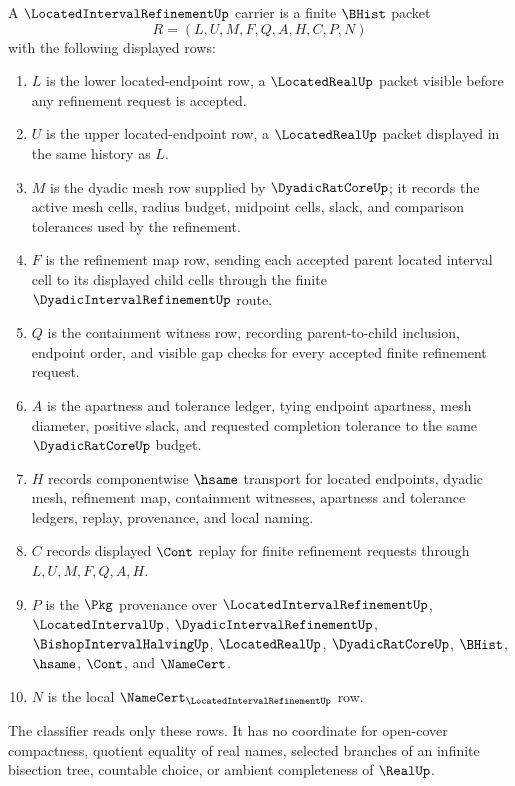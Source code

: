 \begin{definition}
\label{def:located-interval-refinement-carrier}
A $\LocatedIntervalRefinementUp$ carrier is a finite $\BHist$ packet
$$
R=(L,U,M,F,Q,A,H,C,P,N)
$$
with the following displayed rows:
\begin{enumerate}
\item $L$ is the lower located-endpoint row, a $\LocatedRealUp$ packet visible before any refinement request is accepted.
\item $U$ is the upper located-endpoint row, a $\LocatedRealUp$ packet displayed in the same history as $L$.
\item $M$ is the dyadic mesh row supplied by $\DyadicRatCoreUp$; it records the active mesh cells, radius budget, midpoint cells, slack, and comparison tolerances used by the refinement.
\item $F$ is the refinement map row, sending each accepted parent located interval cell to its displayed child cells through the finite $\DyadicIntervalRefinementUp$ route.
\item $Q$ is the containment witness row, recording parent-to-child inclusion, endpoint order, and visible gap checks for every accepted finite refinement request.
\item $A$ is the apartness and tolerance ledger, tying endpoint apartness, mesh diameter, positive slack, and requested completion tolerance to the same $\DyadicRatCoreUp$ budget.
\item $H$ records componentwise $\hsame$ transport for located endpoints, dyadic mesh, refinement map, containment witnesses, apartness and tolerance ledgers, replay, provenance, and local naming.
\item $C$ records displayed $\Cont$ replay for finite refinement requests through $L,U,M,F,Q,A,H$.
\item $P$ is the $\Pkg$ provenance over $\LocatedIntervalRefinementUp$, $\LocatedIntervalUp$, $\DyadicIntervalRefinementUp$, $\BishopIntervalHalvingUp$, $\LocatedRealUp$, $\DyadicRatCoreUp$, $\BHist$, $\hsame$, $\Cont$, and $\NameCert$.
\item $N$ is the local $\NameCert_{\LocatedIntervalRefinementUp}$ row.
\end{enumerate}
The classifier reads only these rows. It has no coordinate for open-cover compactness, quotient equality of real names, selected branches of an infinite bisection tree, countable choice, or ambient completeness of $\RealUp$.
\end{definition}

